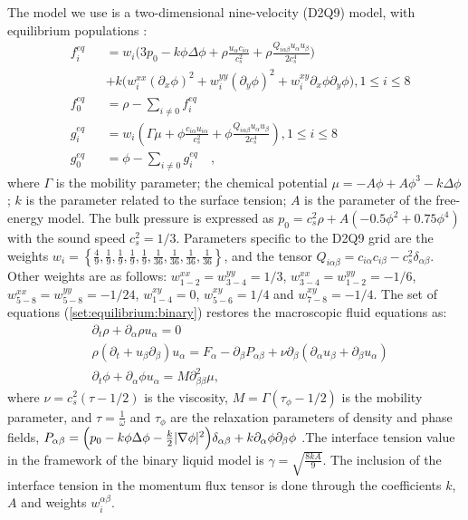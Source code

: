 \documentclass{article}
\begin{document}
The model we use is a two-dimensional nine-velocity (D2Q9) model,
with equilibrium populations \cite{pooley-contact}:
\begin{equation}
\label{set:equilibrium:binary}
\begin{aligned}
&f_i^{eq}&&=w_i 
\biggl(3
p_0 - k \phi \Delta \phi
+\rho\frac{u_{\alpha}c_{i\alpha}}{c_s^2}+\rho \frac{Q_{i\alpha\beta}u_{\alpha } u_ {
\beta}}{2 c_s^4}\biggr)\\
&&&+k\bigl(w_i^{xx} (\partial_x \phi)^2+w_i^{yy} (\partial_y \phi)^2 +w_i^{xy} \partial_x
\phi \partial_y \phi \bigr), 1\leq i \leq 8\\
&f_0^{eq}&&=\rho-\sum_{i\neq0}{f_i^{eq}}\\
&g_i^{eq}&&=w_i\left(\Gamma \mu + \phi\frac{ c_{i\alpha} u_{i\alpha}}{c_s^2}+\phi
\frac{Q_{i\alpha\beta}u_{\alpha}u_{\beta}}{2 c_s^4}\right), 1\leq i \leq 8 \\
&g_0^{eq}&&=\phi-\sum_{i\neq0}{g_i^{eq}}\quad,
\end{aligned}
\end{equation}
where $\Gamma$ is the mobility parameter; the chemical potential
$\mu=-A\phi+A\phi^3-k\Delta\phi$; $k$ is the parameter related to the surface
tension; $A$ is the parameter of the free-energy model. The bulk pressure
is expressed as $p_0=c_s^2 \rho +A (-0.5 \phi^2+0.75 \phi^4)$ with
the sound speed $c_s^2=1/3$. 
Parameters specific to the D2Q9 grid are the weights
$w_i=\left\{\frac{4}{9},\frac{1}{9},\frac{1}{9},\frac{1}{9},\frac{1}{9},
\frac{1}{36},\frac{1}{36},\frac{1}{36},\frac{1}{36}\right\}$, and the tensor
$Q_{i\alpha\beta}=c_{i\alpha} c_{i\beta} - c_s^2 \delta_{\alpha\beta}$.  
Other weights 
are as follows:
$w^{xx}_{1-2}=w^{yy}_{3-4}=1/3$, $w^{xx}_{3-4}=w^{yy}_{1-2}=-1/6$,
$w^{xx}_{5-8}=w^{yy}_{5-8}=-1/24$, $w^{xy}_{1-4}=0$, $w^{xy}_{5-6}=1/4$ and
$w^{xy}_{7-8}=-1/4$. The set of equations (\ref{set:equilibrium:binary}) restores the
macroscopic
fluid equations as:
\begin{equation}
\begin{aligned}
&\partial_t \rho+ \partial_{\alpha} \rho u_{\alpha}=0\\
&\rho\left(\partial_t+u_{\beta}\partial_{\beta}\right) u_{\alpha}= F_{\alpha}
-\partial_{\beta}P_{\alpha \beta} +
\nu\partial_{\beta}\left(\partial_{\alpha}u_{\beta}+\partial_{\beta} u_{\alpha}\right)\\
&\partial_t \phi + \partial_{\alpha} \phi u_{\alpha}=M \partial^2_{\beta\beta} \mu,
\end{aligned}
\label{binary:fluid:system}
\end{equation}
where $\nu=c_s^2 (\tau-1/2)$ is the viscosity,
$M=\Gamma(\tau_{\phi}-1/2)$ is the mobility parameter, and $\tau=\frac{1}{\omega}$ and $\tau_{\phi}$
are the relaxation parameters of density and phase fields, 
$P_{\alpha\beta}=\Bigl(p_0-k\phi \Delta \phi -\frac{k}{2}|\nabla \phi|^2\Bigr)\delta_{\alpha\beta}
+ k \partial_{\alpha} \phi \partial_{\beta} \phi$  \cite{pooley-contact}.The interface tension value
in the framework of the binary liquid model is $\gamma=\sqrt{\frac{8 k
A}{9}}$. The inclusion of the interface tension in the momentum flux tensor is done through the
coefficients $k$, $A$ and weights $w_i^{\alpha\beta}$.
\end{document}
